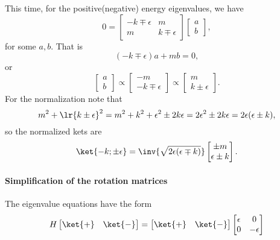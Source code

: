 This time, for the positive(negative) energy eigenvalues, we have
%
\begin{dmath}\label{eqn:gradQuantumProblemSet4Problem3:141}
0
=
\begin{bmatrix}
-k \mp \epsilon & m \\
m & k \mp \epsilon
\end{bmatrix}
\begin{bmatrix}
a \\
b
\end{bmatrix},
\end{dmath}
%
for some \( a, b\).  That is
%
\begin{dmath}\label{eqn:gradQuantumProblemSet4Problem3:161}
(-k \mp \epsilon) a + m b = 0,
\end{dmath}
%
or
%
\begin{dmath}\label{eqn:gradQuantumProblemSet4Problem3:181}
\begin{bmatrix}
a \\
b
\end{bmatrix}
\propto
\begin{bmatrix}
- m \\
-k \mp \epsilon
\end{bmatrix}
\propto
\begin{bmatrix}
m \\
k \pm \epsilon
\end{bmatrix}.
\end{dmath}
%
For the normalization note that
%
\begin{dmath}\label{eqn:gradQuantumProblemSet4Problem3:201}
m^2 + \lr{ k \pm \epsilon }^2
=
m^2 + k^2 + \epsilon^2 \pm 2 k \epsilon
=
2 \epsilon^2 \pm 2 k \epsilon
=
2 \epsilon (\epsilon \pm k),
\end{dmath}
%
so the normalized kets are
%
\begin{dmath}\label{eqn:gradQuantumProblemSet4Problem3:221}
\ket{-k; \pm\epsilon} =
\inv{\sqrt{2 \epsilon(\epsilon \mp k)}}
\begin{bmatrix}
\pm m \\
\epsilon \pm k
\end{bmatrix}.
\end{dmath}
%
\paragraph{Simplification of the rotation matrices}

The eigenvalue equations have the form
%
\begin{dmath}\label{eqn:gradQuantumProblemSet4Problem3:240}
H
\begin{bmatrix}
\ket{+} & \ket{-}
\end{bmatrix}
=
\begin{bmatrix}
\ket{+} & \ket{-}
\end{bmatrix}
\begin{bmatrix}
\epsilon & 0 \\
0 & -\epsilon
\end{bmatrix}
\end{dmath}


